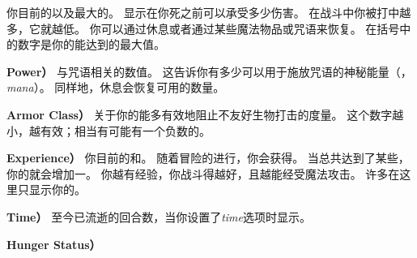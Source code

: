\documentclass[a4paper, 10pt]{article}
\newcommand{\bb}[1]{\bf #1 \hfill}
\begin{document}
你目前的以及最大的\zhTransHitPoints。
\zhTransHitPoints{}显示在你死之前可以承受多少伤害。
在战斗中你被打中越多，它就越低。
你可以通过休息或者通过某些魔法物品或咒语来恢复\zhTransHitPoints。
在括号中的数字是你的\zhTransHitPoints{}能达到的最大值。
\item[\bb{\zhTransPower{\rm （}Power{\rm ）}}]
与咒语相关的数值。
这告诉你有多少可以用于施放咒语的神秘能量（{\it \zhTransMana\/}，{\it mana\/}）。
同样地，休息会恢复可用的数量。
\item[\bb{\zhTransArmorClass{\rm （}Armor Class{\rm ）}}]
关于你的\zhTransArmor{}能多有效地阻止不友好生物打击的度量。
这个数字越小，\zhTransArmor{}越有效；相当有可能有一个负数的\zhTransArmorClass。
\item[\bb{\zhTransExperience{\rm （}Experience{\rm ）}}]
你目前的\zhTransExperienceLevel{}和\zhTransExperiencePoints。
随着冒险的进行，你会获得\zhTransExperiencePoints。
当总共达到了某些\zhTransExperiencePoints，你的\zhTransExperienceLevel{}就会增加一。
你越有经验，你战斗得越好，且越能经受魔法攻击。
许多\zhTransDungeon{}在这里只显示你的\zhTransExperienceLevel。
\item[\bb{\zhTransTime{\rm （}Time{\rm ）}}]
至今已流逝的回合数，当你设置了{\it time}选项时显示。
\item[\bb{\zhTransHungerStatus{\rm （}Hunger Status{\rm ）}}]
\end{document}

